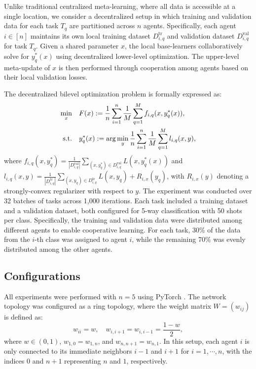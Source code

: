 \documentclass{article}
\theoremstyle{plain}
\theoremstyle{definition}
\theoremstyle{remark}
\begin{document}
Unlike traditional centralized meta-learning, where all data is accessible at a single location, we consider a decentralized setup in which training and validation data for each task \(T_q\) are partitioned across \(n\) agents. Specifically, each agent \(i \in [n]\) maintains its own local training dataset \(D_{i,q}^{\text{tr}}\) and validation dataset \(D_{i,q}^{\text{val}}\) for task \(T_q\). Given a shared parameter \(x\), the local base-learners collaboratively solve for \(y_q^*(x)\) using decentralized lower-level optimization. The upper-level meta-update of \(x\) is then performed through cooperation among agents based on their local validation losses.

The decentralized bilevel optimization problem is formally expressed as:
\begin{align}
\min_x \quad & F(x) := \frac{1}{n} \sum_{i=1}^n \frac{1}{M} \sum_{q=1}^M f_{i,q}(x, y_q^*(x)), \notag\\
\text{s.t.} \quad & y_q^*(x) := \arg\min_y \frac{1}{n} \sum_{i=1}^n \frac{1}{M} \sum_{q=1}^M l_{i,q}(x, y),\notag
\end{align}
where $f_{i,q}(x, y_q^*) = \frac{1}{|D_{i,q}^{\text{val}}|} \sum_{(x, y_q^*) \in D_{i,q}^{\text{val}}} L(x, y_q^*(x))$ and $l_{i,q}(x, y) = \frac{1}{|D_{i,q}^{\text{tr}}|} \sum_{(x, y_q) \in D_{i,q}^{\text{tr}}} L(x, y_q) + R_{i,x}(y_q)$,
with \(R_{i,x}(y)\) denoting a strongly-convex regularizer with respect to \(y\). The experiment was conducted over 32 batches of tasks across 1,000 iterations. Each task included a training dataset and a validation dataset, both configured for 5-way classification with 50 shots per class. 
Specifically, the training and validation data were distributed among different agents to enable cooperative learning. 
For each task, 30\% of the data from the $i$-th class was assigned to agent $i$, while the remaining 70\% was evenly distributed among the other agents.

\subsection{Configurations}
All experiments were performed with $n=5$ using PyTorch \citep{paszke2019pytorch}. The network topology was configured as a ring topology, where the weight matrix \(W = (w_{ij})\) is defined as: 
\begin{equation*}
    w_{ii} = w, \quad w_{i,i+1} = w_{i,i-1} = \frac{1-w}{2}, 
\end{equation*}
where $w \in (0,1)$, \(w_{1,0} = w_{1,n}\), and \(w_{n,n+1} = w_{n,1}\). In this setup, each agent \(i\) is only connected to its immediate neighbors \(i-1\) and \(i+1\) for $i=1,\cdots,n$, with the indices \(0\) and \(n+1\) representing \(n\) and \(1\), respectively.
\end{document}
